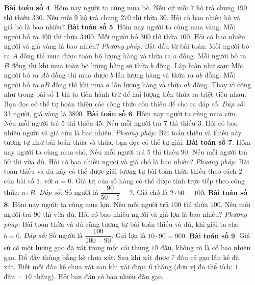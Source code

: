 \begin{multicols}{2}
	\vskip 0.1cm
	\textbf{\color{diendantoanhoc}Bài toán số $\pmb{4.}$} Hôm nay người ta cùng mua bò. Nếu cứ mỗi $7$ hộ trả chung $190$ thì thiếu $330$. Nếu mỗi $9$ hộ trả chung $270$ thì thừa $30$. Hỏi có bao nhiêu hộ và giá bò là bao nhiêu?
	\vskip 0.1cm
	\textbf{\color{diendantoanhoc}Bài toán số $\pmb{5.}$} Hôm nay người ta cùng mua vàng. Mỗi người bỏ ra $400$ thì thừa $3400$. Mỗi người bỏ $300$ thì thừa $100$. Hỏi có bao nhiêu người và giá vàng là bao nhiêu?
	\vskip 0.1cm
	\textit{Phương pháp:}
	\vskip 0.1cm 
	Bắt đầu từ bài toán:
	\vskip 0.1cm
	Mỗi người bỏ ra $A$ đồng thì mua được toàn bộ lượng hàng và thừa ra $a$ đồng.
	\vskip 0.1cm
	Mỗi người bỏ ra $B$ đồng thì khi mua toàn bộ lượng hàng sẽ thừa $b$ đồng.
	\vskip 0.1cm
	Lập luận như sau:
	\vskip 0.1cm
	Mỗi người bỏ ra $Ab$ đồng thì mua được $b$ lần lượng hàng và thừa ra $ab$ đồng.
	\vskip 0.1cm
	Mỗi người bỏ ra $aB$ đồng thì khi mua $a$ lần lượng hàng và thừa $ab$ đồng.
	\vskip 0.1cm
	Thay vì cộng như trong bài số $1$ thì ta tiến hành trừ để hai lượng tiền thừa ra triệt tiêu nhau. Bạn đọc có thể tự hoàn thiện các công thức còn thiếu để cho ra đáp số.
	\vskip 0.1cm
	\textit{Đáp số:} $33$ người, giá vàng là $3800$.
	\vskip 0.1cm
	\textbf{\color{diendantoanhoc}Bài toán số $\pmb{6.}$} Hôm nay người ta cùng mua cừu. Nếu mỗi người trả $5$ thì thiếu $45$. Nếu mỗi người trả $7$ thì thiếu $3$. Hỏi có bao nhiêu người và giá cừu là bao nhiêu.
	\vskip 0.1cm
	\textit{Phương pháp:} Bài toán thiếu và thiếu này tương tự như bài toán thừa và thừa, bạn đọc có thể tự giải.
	\vskip 0.1cm
	\textbf{\color{diendantoanhoc}Bài toán số $\pmb{7.}$} Hôm nay người ta cùng mua chó. Nếu mỗi người trả $5$ thì thiếu $90$. Nếu mỗi người trả $50$ thì vừa đủ. Hỏi có bao nhiêu người và giá chó là bao nhiêu?
	\vskip 0.1cm
	\textit{Phương pháp:} Bài toán thiếu và đủ này có thể được giải tương tự bài toán thừa thiếu theo cách $2$ của bài số $1$, với $a=0$. Giá trị của số hàng có thể được tính trực tiếp theo công thức: $n\cdot B$.
	\vskip 0.1cm
	\textit{Đáp số:} Số người là $\dfrac{90}{50-5} = 2$. Giá chó là $2\cdot 50=100$.
	\vskip 0.1cm
	\textbf{\color{diendantoanhoc}Bài toán số $\pmb{8.}$} Hôm nay người ta cùng mua lợn. Nếu mỗi người trả $100$ thì thừa $100$. Nếu mỗi người trả $90$ thì vừa đủ. Hỏi có bao nhiêu người và giá lợn là bao nhiêu?
	\vskip 0.1cm
	\textit{Phương pháp:} Bài toán thừa và đủ cũng tương tự bài toán thiếu và đủ, khi giải ta cho $b=0$.
	\vskip 0.1cm
	\textit{Đáp số:} Số người là $\dfrac{100}{100-90}$. Giá lợn là $10\cdot90=900$.
	\vskip 0.1cm
	\textbf{\color{diendantoanhoc}Bài toán số $\pmb{9.}$} Giả sử có một lượng gạo đã xát trong một cái thùng $10$ đấu, không rõ là có bao nhiêu gạo. Đổ đầy thùng bằng kê chưa xát. Sau khi xát được $7$ đấu cả gạo lẫn kê đã xát. Biết mỗi đấu kê chưa xát sau khi xát được $6$ thăng (đơn vị đo thể tích: $1$ đấu = $10$ thăng). Hỏi ban đầu có bao nhiêu đấu gạo.

\end{multicols}
